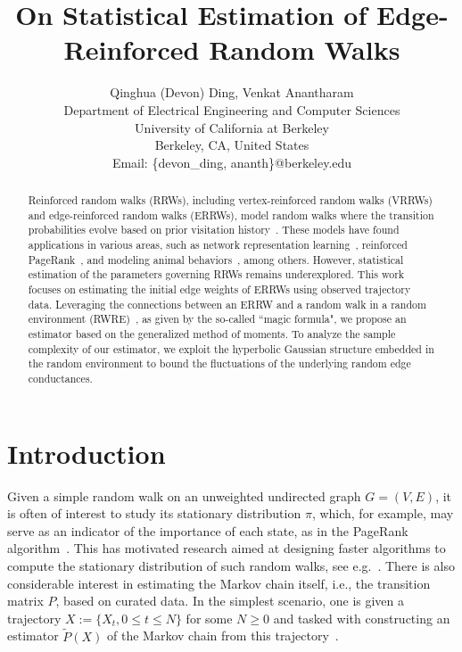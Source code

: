 \documentclass[a4paper, 11pt]{article}
\title{On Statistical Estimation of Edge-Reinforced Random Walks}
\author{Qinghua (Devon) Ding, \quad Venkat Anantharam\\
  Department of Electrical Engineering and Computer Sciences\\
                    University of California at Berkeley\\
                    Berkeley, CA, United States\\
                    Email: \{devon\_ding, ananth\}@berkeley.edu}
\begin{document}
\maketitle

\begin{abstract}
Reinforced random walks (RRWs), including vertex-reinforced random walks (VRRWs) and edge-reinforced random walks (ERRWs), model random walks where the transition probabilities evolve based on prior visitation history~\cite{mgr, fmk, tarres, volkov}. These models have found applications in various areas, such as network representation  learning~\cite{xzzs}, reinforced PageRank~\cite{gly}, and modeling animal behaviors~\cite{smouse}, among others. However, statistical estimation of the parameters governing RRWs remains underexplored. This work focuses on estimating the initial edge weights of ERRWs using observed trajectory data. Leveraging the connections between an ERRW and a random walk in a random environment (RWRE)~\cite{mr, mr2}, as given by the so-called ``magic formula", we propose an estimator based on the generalized method of moments. To analyze the sample complexity of our estimator, we exploit the hyperbolic Gaussian structure embedded in the random environment to bound the fluctuations of the underlying random edge conductances.
\end{abstract}


\section{Introduction}


Given a simple random walk on an unweighted undirected graph $G=(V, E)$, it is often of interest to study its stationary distribution $\pi$, which, for example, may serve as an indicator of the importance of each state, as in the PageRank algorithm~\cite{page}. 
This has motivated research aimed at designing
faster algorithms to compute the stationary distribution of such random walks, see e.g.~\cite{dmpu,lbgs}.
There is also considerable
interest in estimating the Markov chain itself, i.e., the transition matrix $P$, based on curated data. In the simplest scenario, one is given a trajectory $X:=\{X_t, 0 \le t \le N \}$ for some $N \ge 0$ and tasked with constructing an estimator $\tilde{P}(X)$ of the Markov chain from this trajectory~\cite{ddg, wk, cdl}.
\end{document}
